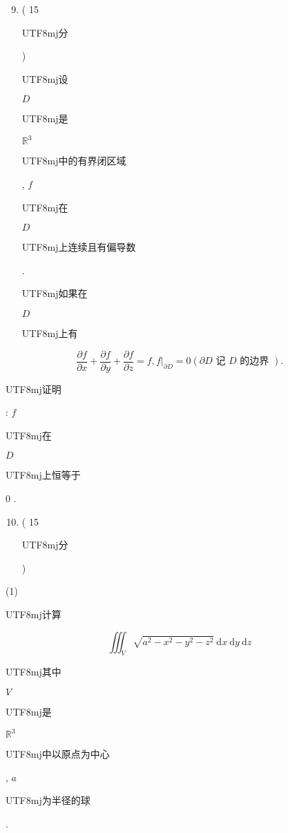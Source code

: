 \documentclass[10pt]{article}
\begin{document}
\begin{enumerate}
  \setcounter{enumi}{8}
  \item ( 15 \begin{CJK}{UTF8}{mj}分\end{CJK}) \begin{CJK}{UTF8}{mj}设\end{CJK} $D$ \begin{CJK}{UTF8}{mj}是\end{CJK} $\mathbb{R}^{3}$ \begin{CJK}{UTF8}{mj}中的有界闭区域\end{CJK}, $f$ \begin{CJK}{UTF8}{mj}在\end{CJK} $D$ \begin{CJK}{UTF8}{mj}上连续且有偏导数\end{CJK}. \begin{CJK}{UTF8}{mj}如果在\end{CJK} $D$ \begin{CJK}{UTF8}{mj}上有\end{CJK}
\end{enumerate}
$$
\frac{\partial f}{\partial x}+\frac{\partial f}{\partial y}+\frac{\partial f}{\partial z}=f,\left.f\right|_{\partial D}=0(\partial D \text { 记 } D \text { 的边界 }) .
$$
\begin{CJK}{UTF8}{mj}证明\end{CJK}: $f$ \begin{CJK}{UTF8}{mj}在\end{CJK} $D$ \begin{CJK}{UTF8}{mj}上恒等于\end{CJK} 0 .

\begin{enumerate}
  \setcounter{enumi}{9}
  \item ( 15 \begin{CJK}{UTF8}{mj}分\end{CJK})
\end{enumerate}
(1) \begin{CJK}{UTF8}{mj}计算\end{CJK}
$$
\iiint_{V} \sqrt{a^{2}-x^{2}-y^{2}-z^{2}} \mathrm{~d} x \mathrm{~d} y \mathrm{~d} z
$$
\begin{CJK}{UTF8}{mj}其中\end{CJK} $V$ \begin{CJK}{UTF8}{mj}是\end{CJK} $\mathbb{R}^{3}$ \begin{CJK}{UTF8}{mj}中以原点为中心\end{CJK}, $a$ \begin{CJK}{UTF8}{mj}为半径的球\end{CJK}.
\end{document}
